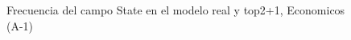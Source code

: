 \begin{figure}[H]
    \centering
    
    \caption{Frecuencia del campo State en el modelo real y top2+1, Economicos (A-1)}
    \label{frecuency-State-top2+1}
\end{figure}